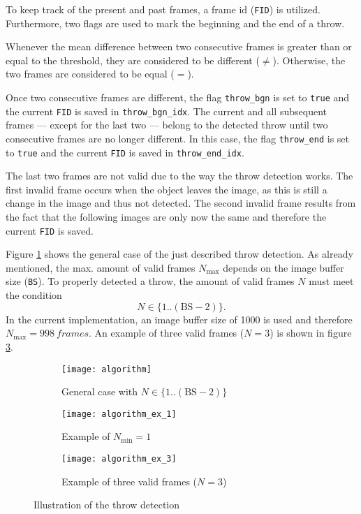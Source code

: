 To keep track of the present and past frames, a frame id (\texttt{FID}) is utilized.
Furthermore, two flags are used to mark the beginning and the end of a throw.

Whenever the mean difference between two consecutive frames is greater than or equal to the threshold, they are considered to be different ($\ne$).
Otherwise, the two frames are considered to be equal ($=$).

Once two consecutive frames are different, the flag \texttt{throw\_bgn} is set to \texttt{true} and the current \texttt{FID} is saved in \texttt{throw\_bgn\_idx}.
The current and all subsequent frames --- except for the last two --- belong to the detected throw until two consecutive frames are no longer different.
In this case, the flag \texttt{throw\_end} is set to \texttt{true} and the current \texttt{FID} is saved in \texttt{throw\_end\_idx}.

The last two frames are not valid due to the way the throw detection works.
The first invalid frame occurs when the object leaves the image, as this is still a change in the image and thus not detected.
The second invalid frame results from the fact that the following images are only now the same and therefore the current \texttt{FID} is saved.

\clearpage

Figure \ref{subfig:algorithm_general_case} shows the general case of the just described throw detection.
As already mentioned, the max. amount of valid frames $N_\text{max}$ depends on the image buffer size (\texttt{BS}).
To properly detected a throw, the amount of valid frames $N$ must meet the condition
\[
  N \in \{1..(\text{BS}-2)\}.
\]
In the current implementation, an image buffer size of \SI{1000}{} is used and therefore $N_\text{max} = \SI{998}{frames}$.
An example of three valid frames ($N = 3$) is shown in figure \ref{subfig:algorithm_example_3}.

\begin{figure}[t]
  \centering
  \begin{subfigure}[b]{\textwidth}
    \texttt{[image: algorithm]}
    \caption{General case with $N \in \{1..(\text{BS}-2)\}$}
    \label{subfig:algorithm_general_case}
  \end{subfigure}
  \begin{subfigure}[b]{\textwidth}
    \texttt{[image: algorithm\_ex\_1]}
    \caption{Example of $N_\text{min} = 1$}
    \label{subfig:algorithm_example_1}
  \end{subfigure}
  \begin{subfigure}[b]{\textwidth}
    \texttt{[image: algorithm\_ex\_3]}
    \caption{Example of three valid frames ($N = 3$)}
    \label{subfig:algorithm_example_3}
  \end{subfigure}
  \caption{Illustration of the throw detection}
  \label{fig:throw_detection}
\end{figure}
